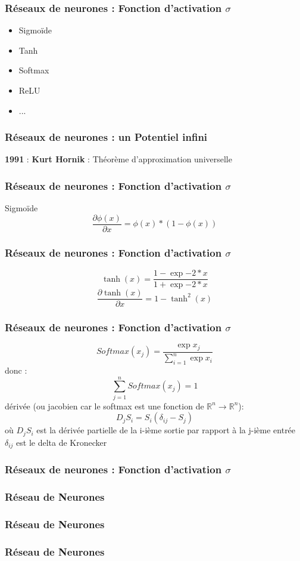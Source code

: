 \begin{frame}
  \frametitle{Réseaux de neurones : Fonction d'activation $\sigma$}
  \begin{itemize}
  \item Sigmoïde
  \item Tanh
  \item Softmax
  \item ReLU
  \item ...
  \end{itemize}
\end{frame}

\begin{frame}
  \frametitle{Réseaux de neurones : un Potentiel infini}
  \textbf{1991} : \textbf{Kurt Hornik} : Théorème d'approximation universelle
\end{frame}

\begin{frame}
  \frametitle{Réseaux de neurones : Fonction d'activation $\sigma$}
  Sigmoïde
  \[
  \frac{\partial{\phi(x)}}{\partial{x}}=\phi(x)*(1-\phi(x))
  \]
\end{frame}

\begin{frame}
  \frametitle{Réseaux de neurones : Fonction d'activation $\sigma$}
  \[
  \tanh(x)=\frac{1-\exp{-2*x}}{1+\exp{-2*x}}
  \]
  \[
  \frac{\partial{\tanh(x)}}{\partial{x}}=1-\tanh^2(x)
  \]
\end{frame}

\begin{frame}
  \frametitle{Réseaux de neurones : Fonction d'activation $\sigma$}
  \[
  \mathit{Softmax}(x_j)=\frac{\exp{x_j}}{\sum_{i=1}^n{\exp{x_i}}}
  \]
  donc :
  \[
  \sum_{j=1}^n{\mathit{Softmax}(x_j)}=1
  \]
  dérivée (ou jacobien car le softmax est une fonction de $\mathbb{R}^n\rightarrow\mathbb{R}^n$):
  \[
  D_jS_i = S_i(\delta_{ij}-S_j)
  \]
  où
  $D_jS_i$ est la dérivée partielle de la i-ième sortie par rapport à la j-ième entrée
  \newline
  $\delta_{ij}$ est le delta de Kronecker
\end{frame}

\begin{frame}
  \frametitle{Réseaux de neurones : Fonction d'activation $\sigma$}
  \begin{minipage}[c]{0.39\linewidth}
  \end{minipage}\hfill
  \begin{minipage}[c]{0.59\linewidth}
  \end{minipage}\hfill
\end{frame}

\begin{frame}
  \frametitle{Réseau de Neurones}
\end{frame}

\begin{frame}
  \frametitle{Réseau de Neurones}
\end{frame}

\begin{frame}
  \frametitle{Réseau de Neurones}
\end{frame}

